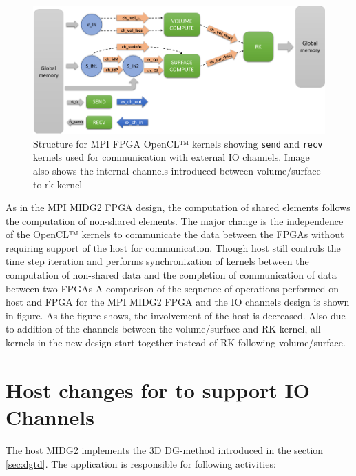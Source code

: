 \begin{figure}[h]%
    \centering
    \includegraphics[width=1.0\textwidth]{images/iochan_kernstruc}
    \caption{Structure for MPI FPGA OpenCL™ kernels showing \texttt{send} and \texttt{recv}
    kernels used for communication with external IO channels. Image also shows the internal
    channels introduced between volume/surface to rk kernel}
    \label{fig:iochan_kernstruc}
\end{figure}

As in the MPI MIDG2 FPGA design, the computation of shared elements follows the computation of
non-shared elements. The major change is the independence of the OpenCL™ kernels to
communicate the data between the FPGAs without requiring support of the host for
communication. Though host still controls the time step iteration and performs synchronization of kernels between
the computation of non-shared data and the completion of communication of data between two FPGAs
A comparison of the sequence of operations performed on host and FPGA for the MPI MIDG2 FPGA and
the IO channels design is shown in figure. As the figure shows, the involvement of the host is
decreased. Also due to addition of the channels between the volume/surface and RK kernel,
all kernels in the new design start together instead of RK following volume/surface.


\section{Host changes for to support IO Channels}

The host MIDG2 implements the 3D DG-method introduced in the section \ref{sec:dgtd}.
The application is responsible for following activities:

